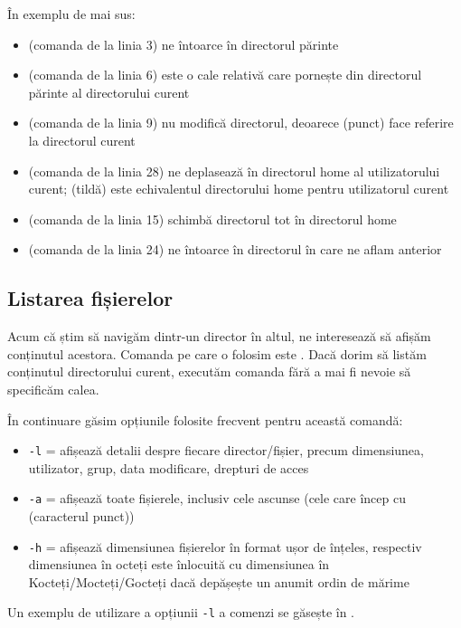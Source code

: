 În exemplu de mai sus:
\begin{itemize}
  \item {} (comanda de la linia 3) ne întoarce în directorul părinte
  \item {} (comanda de la linia 6) este o cale relativă care pornește din directorul părinte al directorului curent
  \item {} (comanda de la linia 9) nu modifică directorul, deoarece  (punct) face referire la directorul curent
  \item {} (comanda de la linia 28) ne deplasează în directorul home al utilizatorului curent;
    \file{\textasciitilde} (tildă) este echivalentul directorului home pentru utilizatorul curent
  \item {} (comanda de la linia 15) schimbă directorul tot în directorul home
  \item {} (comanda de la linia 24) ne întoarce în directorul în care ne aflam anterior
\end{itemize}

\subsection{Listarea fișierelor}
\label{sec:fs:ls}

Acum că știm să navigăm dintr-un director în altul, ne interesează să afișăm conținutul acestora.
Comanda pe care o folosim este .
Dacă dorim să listăm conținutul directorului curent, executăm comanda  fără a mai fi nevoie să specificăm calea.

În continuare găsim opțiunile folosite frecvent pentru această comandă:

\begin{itemize}
  \item \texttt{-l} = afișează detalii despre fiecare director/fișier, precum dimensiunea, utilizator, grup, data modificare, drepturi
    de acces
  \item \texttt{-a} = afișează toate fișierele, inclusiv cele ascunse (cele care încep cu  (caracterul punct))
  \item \texttt{-h} = afișează dimensiunea fișierelor în format ușor de înțeles, respectiv dimensiunea în octeți este înlocuită cu dimensiunea în Kocteți/Mocteți/Gocteți dacă depășește un anumit ordin de mărime
\end{itemize}

Un exemplu de utilizare a opțiunii \texttt{-l} a comenzi  se găsește în .

